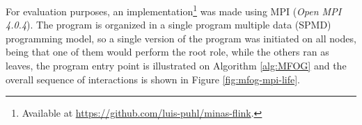 


For evaluation purposes, an \mfog implementation\footnote{Available at
\url{https://github.com/luis-puhl/minas-flink}.} was made using MPI (\emph{Open
MPI 4.0.4}).
The program is organized in a single program multiple data (SPMD)
programming model, so a single version of the \mfog program was initiated on all
nodes, being that one of them would perform the root role, while the others ran
as leaves, the program entry point is illustrated on Algorithm \ref{alg:MFOG}
and the overall sequence of interactions is shown in Figure \ref{fig:mfog-mpi-life}.

